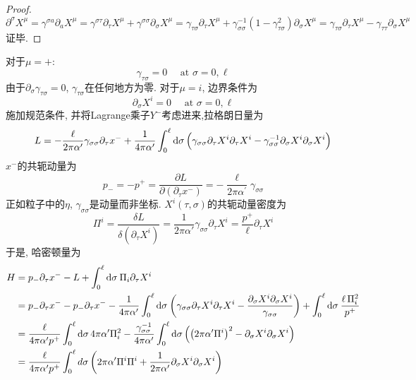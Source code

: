 \begin{proof}
$
\partial^{\sigma} X^{\mu} =\gamma^{\sigma a} \partial_{a} X^{\mu}=\gamma^{\sigma \tau} \partial_{\tau} X^{\mu}+\gamma^{\sigma \sigma} \partial_{\sigma} X^{\mu} =\gamma_{\tau \sigma} \partial_{\tau} X^{\mu}+\gamma_{\sigma \sigma}^{-1}\left(1-\gamma_{\tau \sigma}^{2}\right) \partial_{\sigma} X^{\mu} =\gamma_{\tau \sigma} \partial_{\tau} X^{\mu}-\gamma_{\tau \tau} \partial_{\sigma} X^{\mu}
$
证毕. 
\end{proof}
\noindent 对于$\mu=+$:
\begin{equation}
\gamma_{\tau \sigma}=0 \quad \text { at } \sigma=0, \ell
\end{equation}
由于$\partial_\sigma\gamma_{\tau\sigma}=0$, $\gamma_{\tau\sigma}$在任何地方为零. 
对于$\mu=i$, 边界条件为
\begin{equation}
\partial_{\sigma} X^{i}=0 \quad \text { at } \sigma=0, \ell   \label{bound-mu-i}
\end{equation}
施加规范条件, 并将Lagrange乘子$Y^-$考虑进来,拉格朗日量为
\begin{equation}
L=-\frac{\ell}{2 \pi \alpha^{\prime}} \gamma_{\sigma \sigma} \partial_{\tau} x^{-}+\frac{1}{4 \pi \alpha^{\prime}} \int_{0}^{\ell} \mathrm{d}\sigma\,\Bigl(\gamma_{\sigma \sigma} \partial_{\tau} X^{i} \partial_{\tau} X^{i}-\gamma_{\sigma \sigma}^{-1} \partial_{\sigma} X^{i} \partial_{\sigma} X^{i}\Bigr)
\end{equation}
$x^-$的共轭动量为
\begin{equation}
p_{-}=-p^{+}=\frac{\partial L}{\partial\left(\partial_{\tau} x^{-}\right)}=-\frac{\ell}{2 \pi \alpha^{\prime}} \gamma_{\sigma \sigma}
\end{equation}
正如粒子中的$\eta$, $\gamma_{\sigma\sigma}$是动量而非坐标. $X^i(\tau,\sigma)$的共轭动量密度为
\begin{equation}
\Pi^{i}=\frac{\delta L}{\delta\left(\partial_{\tau} X^{i}\right)}=\frac{1}{2 \pi \alpha'} \gamma_{\sigma \sigma} \partial_{\tau} X^{i}=\frac{p^{+}}{\ell} \partial_{\tau} X^{i} \label{1.3.18}
\end{equation}
于是, 哈密顿量为
\begin{align}
H &=p_{-} \partial_{\tau} x^{-}-L+\int_{0}^{\ell} \mathrm{d} \sigma\: \Pi_{i} \partial_{\tau} X^{i} \nonumber \\
&= p_{-} \partial_{\tau}  x^{-}-p_{-} \partial_{\tau} x^{-} -\frac{1}{4 \pi \alpha^{\prime}} \int_{0}^{\ell} \mathrm{d} \sigma\:\biggl(\gamma_{\sigma \sigma} \partial_{\tau} X^{i} \partial_{\tau} X^{i}-\frac{\partial_{\sigma} X^{i} \partial_{\sigma} X^{i}}{\gamma_{\sigma \sigma}}\biggr) 
+\int_{0}^{\ell} \mathrm{d} \sigma\: \frac{\ell\,\Pi_{i}^{2} }{ p^{+}} \nonumber \\
&=\frac{\ell}{4 \pi \alpha^{\prime} p^{+}} \int_{0}^{\ell} \mathrm{d} \sigma\, 4 \pi \alpha^{\prime}\Pi_{i}^{2} -\frac{\gamma_{\sigma\sigma}^{-1}}{4 \pi \alpha^{\prime}} \int_{0}^{\ell} \mathrm{d} \sigma\,\Bigl(\left(2 \pi \alpha^{\prime} \Pi^{i}\right)^{2}-\partial_\sigma X^{i} \partial _\sigma X^{i} \Bigr)\nonumber \\
&=\frac{\ell}{4 \pi \alpha^{\prime} p^{+}} \int_{0}^{\ell} d \sigma\left(2 \pi \alpha^{\prime} \Pi^{i} \Pi^{i}+\frac{1}{2 \pi \alpha^{\prime}} \partial_{\sigma} X^{i} \partial_{\sigma} X^{i}\right) \label{1.3.19}
\end{align}
